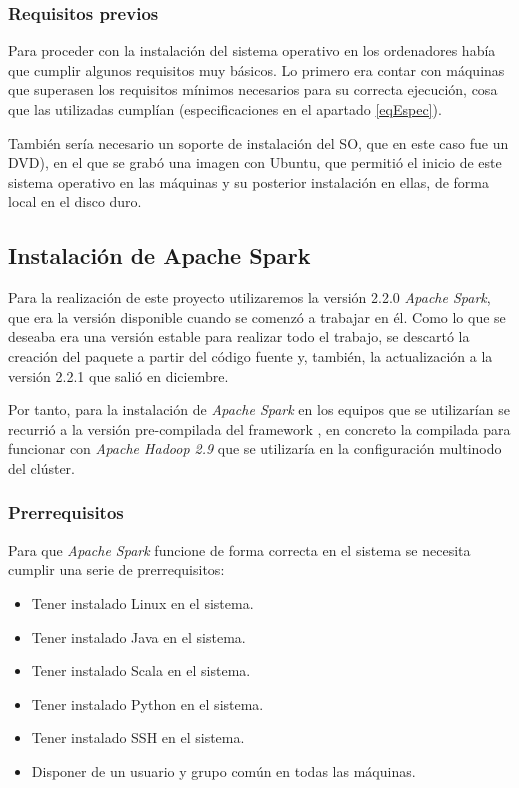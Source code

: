 \subsubsection{Requisitos previos}
Para proceder con la instalación del sistema operativo en los ordenadores había que cumplir algunos requisitos muy básicos. Lo primero era contar con máquinas que superasen los requisitos mínimos \cite{ubuntu} necesarios para su correcta ejecución, cosa que las utilizadas cumplían (especificaciones en el apartado \ref{eqEspec}). 


También sería necesario un soporte de instalación del \gls{SO}, que en este caso fue un \gls{DVD}), en el que se grabó una imagen con Ubuntu, que permitió el inicio de este sistema operativo en las máquinas y su posterior instalación en ellas, de forma local en el disco duro.

\subsection{Instalación de Apache Spark}
Para la realización de este proyecto utilizaremos la versión 2.2.0 \textit{Apache Spark}, que era la versión disponible cuando se comenzó a trabajar en él. Como lo que se deseaba era una versión estable para realizar todo el trabajo, se descartó la creación del paquete a partir del código fuente y, también, la actualización a la versión 2.2.1 que salió en diciembre. 

Por tanto, para la instalación de \textit{Apache Spark} en los equipos que se utilizarían se recurrió a la versión pre-compilada del \Gls{framework} \cite{descargaSpark}, en concreto la compilada para funcionar con \textit{Apache Hadoop 2.9} que se utilizaría en la configuración multinodo del clúster.


\subsubsection{Prerrequisitos}
Para que \textit{Apache Spark} funcione de forma correcta en el sistema se necesita cumplir una serie de prerrequisitos:

\begin{itemize}
	\item Tener instalado Linux en el sistema.
	\item Tener instalado Java en el sistema.
	\item Tener instalado Scala \cite{scala} en el sistema.
	\item Tener instalado Python en el sistema.
	\item Tener instalado SSH en el sistema.
	\item Disponer de un usuario y grupo común en todas las máquinas.
\end{itemize}


